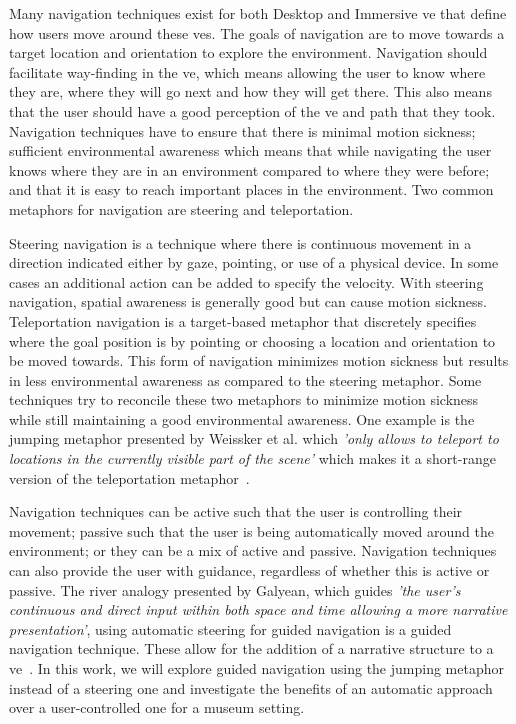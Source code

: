 \label{Chapter:Introduction}
Many navigation techniques exist for both Desktop and Immersive \acrfull{ve} that define how users move around these \acrshort{ve}s. The goals of navigation are to move towards a target location and orientation to explore the environment. Navigation should facilitate way-finding in the \acrshort{ve}, which means allowing the user to know where they are, where they will go next and how they will get there. This also means that the user should have a good perception of the \acrshort{ve} and path that they took. Navigation techniques have to ensure that there is minimal motion sickness; sufficient environmental awareness which means that while navigating the user knows where they are in an environment compared to where they were before; and that it is easy to reach important places in the environment. Two common metaphors for navigation are steering and teleportation.

Steering navigation is a technique where there is continuous movement in a direction indicated either by gaze, pointing, or use of a physical device. In some cases an additional action can be added to specify the velocity. With steering navigation, spatial awareness is generally good but can cause motion sickness. Teleportation navigation is a target-based metaphor that discretely specifies where the goal position is by pointing or choosing a location and orientation to be moved towards. This form of navigation minimizes motion sickness but results in less environmental awareness as compared to the steering metaphor. Some techniques try to reconcile these two metaphors to minimize motion sickness while still maintaining a good environmental awareness. One example is the jumping metaphor presented by Weissker et al. which \textit{'only allows to teleport to locations in the currently visible part of the scene'} which makes it a short-range version of the teleportation metaphor~\cite{Weissker2018}. 

Navigation techniques can be active such that the user is controlling their movement; passive such that the user is being automatically moved around the environment; or they can be a mix of active and passive. Navigation techniques can also provide the user with guidance, regardless of whether this is active or passive. The river analogy presented by Galyean, which guides \textit{'the user’s continuous and direct input within both space and time allowing a more narrative presentation'}, using automatic steering for guided navigation is a guided navigation technique. These allow for the addition of a narrative structure to a \acrshort{ve}~\cite{Galyean1995}. In this work, we will explore guided navigation using the jumping metaphor instead of a steering one and investigate the benefits of an automatic approach over a user-controlled one for a museum setting. 

